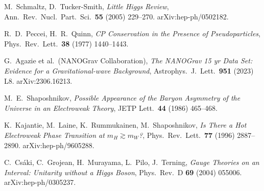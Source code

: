 \documentclass[11pt,a4paper]{article}
\theoremstyle{definition}
\theoremstyle{plain}
\theoremstyle{remark}
\begin{document}
\begin{thebibliography}{99}
M.~Schmaltz, D.~Tucker-Smith, \emph{Little Higgs Review}, Ann.\ Rev.\ Nucl.\ Part.\ Sci.\ \textbf{55} (2005) 229--270. arXiv:hep-ph/0502182.

R.~D.~Peccei, H.~R.~Quinn, \emph{CP Conservation in the Presence of Pseudoparticles}, Phys.\ Rev.\ Lett.\ \textbf{38} (1977) 1440--1443.

G.~Agazie et al.\ (NANOGrav Collaboration), \emph{The NANOGrav 15 yr Data Set: Evidence for a Gravitational-wave Background}, Astrophys.\ J.\ Lett.\ \textbf{951} (2023) L8. arXiv:2306.16213.

M.~E.~Shaposhnikov, \emph{Possible Appearance of the Baryon Asymmetry of the Universe in an Electroweak Theory}, JETP Lett.\ \textbf{44} (1986) 465--468.

K.~Kajantie, M.~Laine, K.~Rummukainen, M.~Shaposhnikov, \emph{Is There a Hot Electroweak Phase Transition at $m_H \gtrsim m_W$?}, Phys.\ Rev.\ Lett.\ \textbf{77} (1996) 2887--2890. arXiv:hep-ph/9605288.

C.~Cs\'aki, C.~Grojean, H.~Murayama, L.~Pilo, J.~Terning, \emph{Gauge Theories on an Interval: Unitarity without a Higgs Boson}, Phys.\ Rev.\ D \textbf{69} (2004) 055006. arXiv:hep-ph/0305237.

\end{thebibliography}

\end{document}

